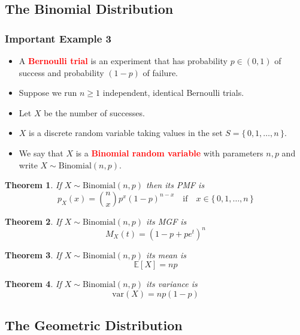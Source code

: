 \documentclass{article}
\newcommand{\E}{\mathbb{E}}
\newcommand{\var}{\text{var}}
\newcommand{\bfred}[1]{\textcolor{red}{\textbf{#1}}}
\theoremstyle{plain}
\newtheorem{thm}{Theorem}[section]
\theoremstyle{definition}
\theoremstyle{remark}
\begin{document}
\subsection{The Binomial Distribution}

\subsubsection*{Important Example 3}

\begin{tcolorbox}[title = Binomial Distribution, colback = SkyBlue!5!white,colframe = SkyBlue!75!black]
    \begin{itemize}
        \item A \bfred{Bernoulli trial} is an experiment that has probability $p \in (0, 1)$ of success and probability $(1-p)$ of failure.
        \item Suppose we run $n \geq 1$ independent, identical Bernoulli trials.
        \item Let $X$ be the number of successes.
        \item $X$ is a discrete random variable taking values in the set $S = \{\,0,1,\dotsc,n\,\}$.
        \item We say that $X$ is a \bfred{Binomial random variable} with parameters $n, p$ and write $X \sim \text{Binomial}(n,p)$.
    \end{itemize}
\end{tcolorbox}

\begin{thm}
    If $X \sim \text{Binomial}(n,p)$ then its PMF is \[p_X(x) = \binom{n}{x}p^x(1-p)^{n-x} \quad \text{if} \quad x \in \{\,0,1,\dotsc,n\,\}\]
\end{thm}

\begin{thm}
    If $X \sim \text{Binomial}(n,p)$ its MGF is \[M_X(t) = (1-p+pe^t)^n\]
\end{thm}

\begin{thm}
    If $X \sim \text{Binomial}(n,p)$ its mean is \[\E[X]=np\]
\end{thm}

\begin{thm}
    If $X \sim \text{Binomial}(n,p)$ its variance is \[\var(X)=np(1-p)\]
\end{thm}

\subsection{The Geometric Distribution}
\end{document}
